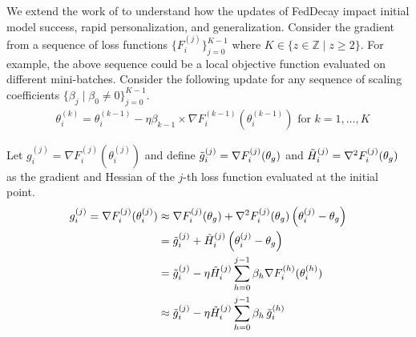 We extend the work of \citet{reptile} to understand how the updates of FedDecay impact initial model success, rapid personalization, and generalization.
Consider the gradient from a sequence of loss functions $\{ F_i^{(j)} \}_{j = 0}^{K - 1}$ where $K \in \{ z \in \mathbb{Z} \mid z \geq 2 \}$.
For example, the above sequence could be a local objective function evaluated on different mini-batches.
Consider the following update for any sequence of scaling coefficients $\{ \beta_j \mid \beta_0 \neq 0 \}_{j = 0}^{K - 1}$. 
\begin{align*}
    & \theta_i^{(k)} = \theta_i^{(k - 1)} - \eta \beta_{k - 1} \times \nabla F_i^{(k - 1)}(\theta_i^{(k - 1)}) \textrm{ for } k = 1, \ldots, K 
\end{align*}

Let $g_i^{(j)} = \nabla F_i^{(j)} ( \theta_i^{(j)} )$ and define $\Tilde{g}_i^{(j)} = \nabla F_i^{(j)} (\theta_g)$ and $\Tilde{H}_i^{(j)} = \nabla^2 F_i^{(j)} (\theta_g)$ as the gradient and Hessian of the $j$-th loss function evaluated at the initial point.
\begin{align*}
    \allowdisplaybreaks
    g_i^{(j)} = \nabla F_i^{(j)}(\theta_i^{(j)}) &\approx \nabla F_i^{(j)}(\theta_g) + \nabla^2 F_i^{(j)}(\theta_g) \left(\theta_i^{(j)} - \theta_g \right) \\
    &= \Tilde{g}_i^{(j)} + \Tilde{H}_i^{(j)} \left( \theta_i^{(j)} - \theta_g \right) \\
    &= \Tilde{g}_i^{(j)} - \eta \Tilde{H}_i^{(j)} \sum_{h = 0}^{j - 1} \beta_{h} \nabla F_i^{(h)}(\theta_i^{(h)}) \\
    &\approx \Tilde{g}_i^{(j)} - \eta \Tilde{H}_i^{(j)} \sum_{h = 0}^{j - 1} \beta_h\, \Tilde{g}_i^{(h)} 
\end{align*}

